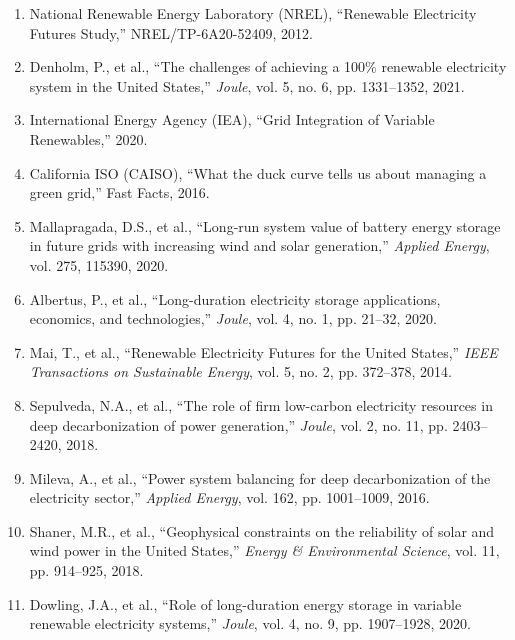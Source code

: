 \documentclass[11pt,a4paper]{article}
\begin{document}
\begin{enumerate}
\item National Renewable Energy Laboratory (NREL), ``Renewable Electricity Futures Study,''
NREL/TP-6A20-52409, 2012.

\item Denholm, P., et al., ``The challenges of achieving a 100\% renewable electricity system
in the United States,'' \textit{Joule}, vol. 5, no. 6, pp. 1331--1352, 2021.

\item International Energy Agency (IEA), ``Grid Integration of Variable Renewables,'' 2020.

\item California ISO (CAISO), ``What the duck curve tells us about managing a green grid,''
Fast Facts, 2016.

\item Mallapragada, D.S., et al., ``Long-run system value of battery energy storage in future
grids with increasing wind and solar generation,'' \textit{Applied Energy}, vol. 275, 115390, 2020.

\item Albertus, P., et al., ``Long-duration electricity storage applications, economics, and
technologies,'' \textit{Joule}, vol. 4, no. 1, pp. 21--32, 2020.

\item Mai, T., et al., ``Renewable Electricity Futures for the United States,'' \textit{IEEE
Transactions on Sustainable Energy}, vol. 5, no. 2, pp. 372--378, 2014.

\item Sepulveda, N.A., et al., ``The role of firm low-carbon electricity resources in deep
decarbonization of power generation,'' \textit{Joule}, vol. 2, no. 11, pp. 2403--2420, 2018.

\item Mileva, A., et al., ``Power system balancing for deep decarbonization of the electricity
sector,'' \textit{Applied Energy}, vol. 162, pp. 1001--1009, 2016.

\item Shaner, M.R., et al., ``Geophysical constraints on the reliability of solar and wind power
in the United States,'' \textit{Energy \& Environmental Science}, vol. 11, pp. 914--925, 2018.

\item Dowling, J.A., et al., ``Role of long-duration energy storage in variable renewable
electricity systems,'' \textit{Joule}, vol. 4, no. 9, pp. 1907--1928, 2020.


\end{enumerate}
\end{document}
